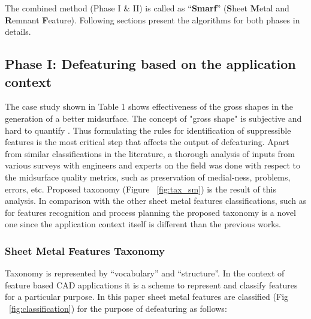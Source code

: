 \bigskip

The combined method (Phase I \& II) is called as ``\textbf{Smarf}'' (\textbf{S}heet \textbf{M}etal and \textbf{R}emnant \textbf{F}eature). Following sections present the algorithms for both phases in details.


\subsection{Phase I: Defeaturing based on the application context}\label{ph1}

The case study shown in Table 1 shows effectiveness of the gross shapes in the generation of a better midsurface. The concept of "gross shape" is subjective and hard to quantify  \cite{LeeLee1998}. Thus formulating the rules for identification of suppressible features is the most critical step that affects the output of defeaturing. Apart from similar classifications in the literature, a thorough analysis of inputs from various surveys with engineers and experts on the field was done with respect to the midsurface quality metrics, such as preservation of medial-ness, problems, errors, etc.  Proposed  taxonomy (Figure ~\ref{fig:tax_sm}) is the result of this analysis. In comparison with the other sheet metal features classifications, such as for features recognition \cite{Gupta2013, Gupta2013a} and process planning \cite{Kannan2009} the proposed taxonomy is a novel one since the application context itself is different than the previous works.
%
%

\subsubsection{Sheet Metal Features Taxonomy}\label{ph11}

Taxonomy is represented by “vocabulary” and “structure”. In the context of feature based CAD applications it is a scheme to represent and classify features for a particular purpose. In this paper sheet metal features are classified  (Fig ~\ref{fig:classification}) for the purpose of defeaturing as follows:

\bigskip

